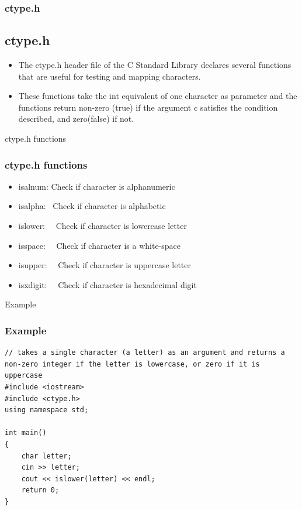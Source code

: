 \documentclass{beamer}
\begin{document}
\begin{frame}[label=ctype.h]
	\frametitle{ctype.h}
	\subsection{ctype.h}
	\begin{itemize}
		\item The ctype.h header file of the C Standard Library declares several functions that are useful for testing and mapping characters.

		\item These functions take the int equivalent of one character as parameter and the functions return non-zero (true) if the argument c satisfies the condition described, and zero(false) if not.
	\end{itemize}
\end{frame}
\begin{frame}{ctype.h functions}
\subsubsection{ctype.h functions}

\begin{itemize}

\item isalnum:
Check if character is alphanumeric
\item isalpha: \ 
Check if character is alphabetic
\item islower: \ \ 
Check if character is lowercase letter
\item isspace: \ \ 
Check if character is a white-space 
\item isupper: \ \ 
Check if character is uppercase letter
\item isxdigit: \ \ 
Check if character is hexadecimal digit 
\end{itemize}
\end{frame}

\begin{frame}[fragile]{Example}
\subsubsection{Example}
\lstset{style=mystyle}
        \begin{lstlisting}
// takes a single character (a letter) as an argument and returns a non-zero integer if the letter is lowercase, or zero if it is uppercase
#include <iostream>
#include <ctype.h>
using namespace std;

int main()
{
    char letter;
    cin >> letter;
    cout << islower(letter) << endl;
    return 0;
}
\end{lstlisting}

\end{frame}
\end{document}
